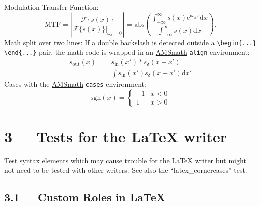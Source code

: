\documentclass[a4paper]{article}
\begin{document}

Modulation Transfer Function:
%
\begin{equation*}
\text{MTF} = \left|\frac{\mathcal{F}\{s(x)\}}
                        {\mathcal{F}\{ s(x)\} |_{\omega _{x}=0}}\right|
           = \mathrm{abs}\left(\frac
                 {\int _{-\infty }^{\infty }s(x) \mathrm{e}^{\mathrm{i}\omega _{x}x}\mathrm{d}{x}}
                 {\int _{-\infty }^{\infty }s(x)\mathrm{d}{x}}
             \right).
\end{equation*}
Math split over two lines: If a double backslash is detected outside a
\texttt{\textbackslash{}begin\{...\} \textbackslash{}end\{...\}} pair, the math code is wrapped in an \href{ftp://ftp.ams.org/ams/doc/amsmath/short-math-guide.pdf}{AMSmath}
\texttt{align} environment:
%
\begin{align*}
s_{\mathrm{out}}(x) & = s_{\mathrm{in}}(x') * s_\delta (x-x') \\
                    & = \int  s_{\mathrm{in}}(x')s_\delta (x-x')\mathrm{d}x'
\end{align*}
Cases with the \href{ftp://ftp.ams.org/ams/doc/amsmath/short-math-guide.pdf}{AMSmath} \texttt{cases} environment:
%
\begin{equation*}
\mathrm{sgn}(x) = \begin{cases}
                    -1 & x<0\\
                     1 & x>0
                  \end{cases}
\end{equation*}

\section{3   Tests for the LaTeX writer%
  \label{tests-for-the-latex-writer}%
}

Test syntax elements which may cause trouble for the LaTeX writer but might
not need to be tested with other writers. See also the
“latex\_cornercases” test.


\subsection{3.1   Custom Roles in LaTeX%
  \label{custom-roles-in-latex}%
}
\end{document}
